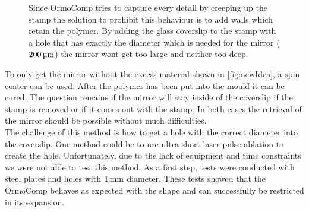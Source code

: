 \begin{figure}[H]
	
	\caption{Since OrmoComp tries to capture every detail by creeping up the stamp the solution to prohibit this behaviour is to add walls which retain the polymer. By adding the glass coverslip to the stamp with a hole that has exactly the diameter which is needed for the mirror ($200\um$) the mirror wont get too large and neither too deep.}
	\label{fig:newIdea}
\end{figure}

To only get the mirror without the excess material shown in \autoref{fig:newIdea}, a spin coater can be used. After the polymer has been put into the mould it can be cured. The question remains if the mirror will stay inside of the coverslip if the stamp is removed or if it comes out with the stamp. In both cases the retrieval of the mirror should be possible without much difficulties.\\
The challenge of this method is how to get a hole with the correct diameter into the coverslip. One method could be to use ultra-short laser pulse ablation to create the hole.  Unfortunately, due to the lack of equipment and time constraints we were not able to test this method. As a first step, tests were conducted with steel plates and holes with $1\mm$ diameter. These tests showed that the OrmoComp behaves as expected with the shape and can successfully be restricted in its expansion.